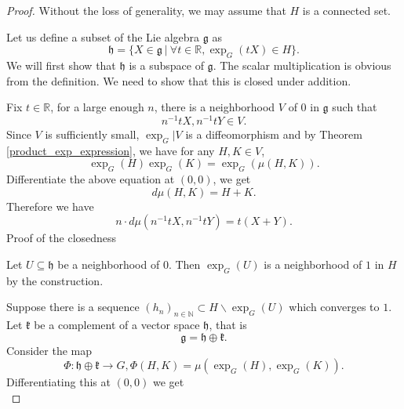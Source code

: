 \documentclass{article}
\numberwithin{equation}{section}
\begin{document}
\begin{proof}
Without the loss of generality, we may assume that $H$ is a connected set.\\
\par Let us define a subset of the Lie algebra $\mathfrak{g}$ as
\begin{equation*}
\mathfrak{h} = \{X\in\mathfrak{g}\:|\:\forall t\in\mathbb{R}, \exp_G(tX)\in H\}.
\end{equation*}
We will first show that $\mathfrak{h}$ is a subspace of $\mathfrak{g}$. The scalar multiplication is obvious from the definition. We need to show that this is closed under addition. \\
\par Fix $t\in\mathbb{R}$, for a large enough $n$, there is a neighborhood $V$ of $0$ in $\mathfrak{g}$ such that
\begin{equation*}
n^{-1}tX,n^{-1}tY\in V.
\end{equation*}
Since $V$ is sufficiently small, $\exp_G|V$ is a diffeomorphism and by Theorem \ref{product_exp_expression}, we have for any $H,K\in V$,
\begin{equation*}
\exp_G(H)\exp_G(K)=\exp_G(\mu(H,K)).
\end{equation*}
Differentiate the above equation at $(0,0)$, we get
\begin{equation*}
d\mu(H,K) = H+K.
\end{equation*}
Therefore we have
\begin{equation*}
n\cdot d\mu(n^{-1}tX,n^{-1}tY) = t(X+Y).
\end{equation*}
Proof of the closedness\\%
\par Let $U\subseteq\mathfrak{h}$ be a neighborhood of $0$. Then $\exp_G(U)$ is a neighborhood of $1$ in $H$ by the construction.\\
\par Suppose there is a sequence $(h_n)_{n\in\mathbb{N}}\subset H\backslash\exp_G(U)$ which converges to $1$. Let $\mathfrak{k}$ be a complement of a vector space $\mathfrak{h}$, that is 
\begin{equation*}
\mathfrak{g} = \mathfrak{h}\oplus\mathfrak{k}.
\end{equation*}
Consider the map
\begin{equation*}
\Phi:\mathfrak{h}\oplus\mathfrak{k}\to G, \Phi(H,K) = \mu(\exp_G(H),\exp_G(K)).
\end{equation*}
Differentiating this at $(0,0)$ we get
\begin{equation*}

\end{equation*}
\end{proof}
\end{document}
